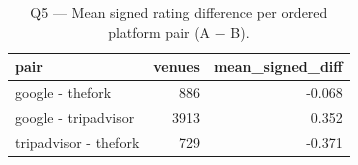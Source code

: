 \begin{table}[ht]
\centering
\caption{Q5 — Mean signed rating difference per ordered platform pair (A − B).}
\label{tab:q5_pairwise_differences}
{\tiny
\begin{tabular}{lrr}
\toprule
pair & venues & mean\_signed\_diff \\
\midrule
google - thefork & 886 & -0.068 \\
google - tripadvisor & 3913 & 0.352 \\
tripadvisor - thefork & 729 & -0.371 \\
\bottomrule
\end{tabular}
}
\end{table}
